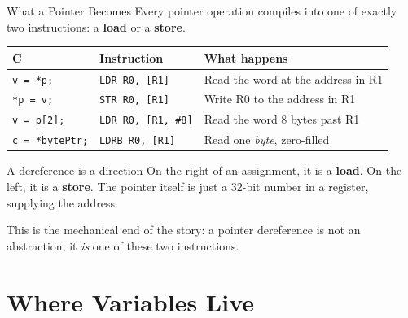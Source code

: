 \documentclass[9pt,aspectratio=169,xcolor=table]{beamer}
\begin{document}
\begin{frame}{What a Pointer Becomes}
    \leavevmode
    Every pointer operation compiles into one of exactly \alert{two}
    instructions: a \textbf{load} or a \textbf{store}.

    \vspace{2mm}
    \begin{center}
    {\small
    \striped
    \begin{tabular}{@{}l l R{.44\textwidth}@{}}
        \toprule
        \textbf{C} & \textbf{Instruction} & \textbf{What happens} \\
        \midrule
        \texttt{v = *p;}       & \texttt{LDR R0, [R1]}      & Read the word at the address in R1 \\
        \texttt{*p = v;}       & \texttt{STR R0, [R1]}      & Write R0 to the address in R1 \\
        \texttt{v = p[2];}     & \texttt{LDR R0, [R1, \#8]} & Read the word 8 bytes past R1 \\
        \texttt{c = *bytePtr;} & \texttt{LDRB R0, [R1]}     & Read one \emph{byte}, zero-filled \\
        \bottomrule
    \end{tabular}}
    \end{center}

    \vspace{2mm}
    \begin{block}{A dereference is a direction}
        On the \alert{right} of an assignment, it is a \textbf{load}.
        On the \alert{left}, it is a \textbf{store}. The pointer
        itself is just a 32-bit number in a register, supplying the
        address.
    \end{block}

    \vspace{2mm}
    {\small This is the mechanical end of the story: a pointer
    dereference is not an abstraction, it \emph{is} one of these two
    instructions.}
\end{frame}


\section{Where Variables Live}
\end{document}
